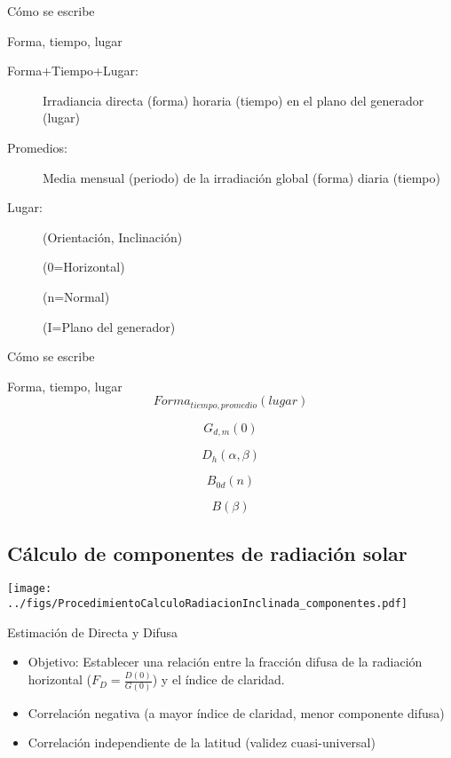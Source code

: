 \documentclass[xcolor={usenames,svgnames,dvipsnames}]{beamer}
\begin{document}
\begin{frame}[label={sec:org3b8eebe}]{Cómo se escribe}
\begin{block}{Forma, tiempo, lugar}
\begin{description}
\item[{Forma+Tiempo+Lugar:}] Irradiancia directa (forma) horaria (tiempo)
en el plano del generador (lugar)

\item[{Promedios:}] Media mensual (periodo) de la irradiación global
(forma) diaria (tiempo)

\item[{Lugar:}] (Orientación, Inclinación)

(0=Horizontal)

(n=Normal)

(I=Plano del generador)
\end{description}
\end{block}
\end{frame}

\begin{frame}[label={sec:org43fc6d0}]{Cómo se escribe}
\begin{block}{Forma, tiempo, lugar}
\[Forma_{tiempo,promedio}(lugar)\]

\[G_{d,m}(0)\]

\[D_{h}(\alpha,\beta)\]

\[B_{0d}(n)\]

\[B(\beta)\]
\end{block}
\end{frame}
\subsection{Cálculo de componentes de radiación solar}
\label{sec:org8f0b233}

\begin{frame}[label={sec:org1c84fbf}]{}
\begin{center}
\texttt{[image: ../figs/ProcedimientoCalculoRadiacionInclinada\_componentes.pdf]}
\end{center}
\end{frame}

\begin{frame}[label={sec:orge330dd0}]{Estimación de Directa y Difusa}
\begin{itemize}
\item Objetivo: Establecer una \alert{relación entre la fracción difusa} de la radiación horizontal (\(F_{D}=\frac{D(0)}{G(0)}\)) y \alert{el índice de claridad}.

\item \alert{Correlación negativa} (a mayor índice de claridad, menor componente difusa)

\item \alert{Correlación independiente de la latitud} (validez cuasi-universal)
\end{itemize}
\end{frame}
\end{document}
